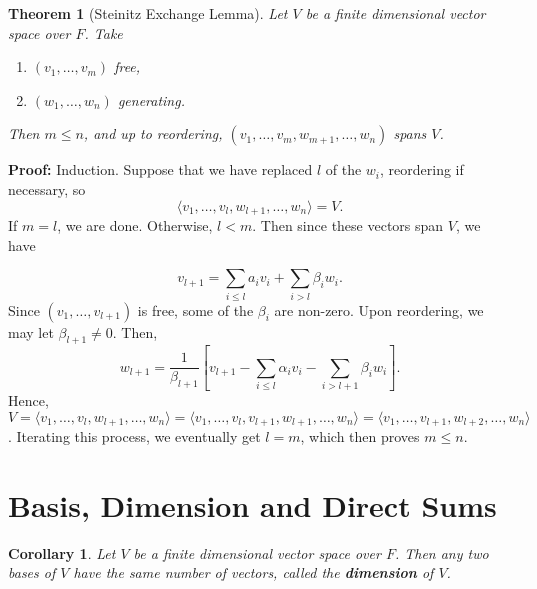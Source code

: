 \documentclass[12pt]{article}
\newtheorem{theorem}{Theorem}[section]
\newtheorem{corollary}{Corollary}[section]
\theoremstyle{definition}
\theoremstyle{remark}
\begin{document}
\begin{theorem}[Steinitz Exchange Lemma]
	Let $V$ be a finite dimensional vector space over $F$. Take
	\begin{enumerate}[\normalfont(i)]
		\item $(v_1, \ldots, v_m)$ free,
		\item $(w_1, \ldots, w_n)$ generating.
	\end{enumerate}
	Then $m \leq n$, and up to reordering, $(v_1, \ldots, v_m, w_{m+1}, \ldots, w_n)$ spans $V$.
\end{theorem}

\begin{adjustbox}{minipage = \columnwidth - 25.5pt, margin=1em, frame=1pt, margin=0em}
\textbf{Proof:} Induction. Suppose that we have replaced $l$ of the $w_i$, reordering if necessary, so
\[
	\langle v_1, \ldots, v_{l}, w_{l+1}, \ldots, w_n \rangle = V
.\]
If $m = l$, we are done. Otherwise, $l < m$. Then since these vectors span $V$, we have

 
\end{adjustbox}

\begin{adjustbox}{minipage = \columnwidth - 25.5pt, margin=1em, frame=1pt, margin=0em}
\[
v_{l+1} = \sum_{i \leq l}a_i v_i + \sum_{i > l}\beta_i w_i
.\]
	Since $(v_1, \ldots, v_{l+1})$ is free, some of the $\beta_i$ are non-zero. Upon reordering, we may let $\beta_{l+1} \neq 0$. Then,
\[
	w_{l+1} = \frac{1}{\beta_{l+1}} \left[ v_{l+1} - \sum_{i \leq l}\alpha_i v_i - \sum_{i > l+1} \beta_i w_i \right]
.\]
Hence, $V = \langle v_1, \ldots, v_l, w_{l+1}, \ldots, w_n \rangle = \langle v_1, \ldots, v_l, v_{l+1}, w_{l+1}, \ldots, w_n \rangle = \langle v_1, \ldots, v_{l+1}, w_{l+2}, \ldots, w_n \rangle$. Iterating this process, we eventually get $l = m$, which then proves $m \leq n$.
\end{adjustbox}

\newpage

\section{Basis, Dimension and Direct Sums}%
\label{sec:basis_dimension_and_direct_sums}

\begin{corollary}
	Let $V$ be a finite dimensional vector space over $F$. Then any two bases of $V$ have the same number of vectors, called the \textbf{dimension} of $V$.
\end{corollary}
\end{document}
